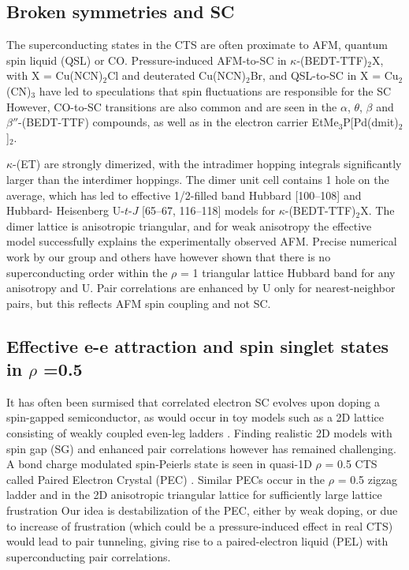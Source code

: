 \documentclass[a4paper,11pt]{article}
\begin{document}
\subsection{Broken symmetries and SC}
The superconducting states in the CTS are often proximate to AFM, quantum spin liquid (QSL) or CO. 
Pressure-induced AFM-to-SC in $\kappa$-(BEDT-TTF)$_{2}$X, 
with X = Cu(NCN)$_{2}$Cl and deuterated Cu(NCN)$_{2}$Br, and QSL-to-SC in X = Cu$_{2}$(CN)$_{3}$ have led to speculations that
spin fluctuations are responsible for the SC \cite{kino98a}%
However, CO-to-SC transitions
are also common and are seen in the $\alpha$, $\theta$, $\beta$ and  $\beta''$-(BEDT-TTF) compounds, 
as well as in the electron carrier EtMe$_{3}$P[Pd(dmit)$_{2}$]$_{2}$. 


$\kappa$-(ET) are strongly dimerized, with the intradimer
hopping integrals significantly larger than the interdimer hoppings. The dimer unit cell contains
1 hole on the average, which has led to effective 1/2-filled band Hubbard [100–108] and Hubbard-
Heisenberg U-$t$-$J$ [65–67, 116–118] models for $\kappa$-(BEDT-TTF)$_{2}$X. The dimer lattice is anisotropic triangular,
and for weak anisotropy the effective model successfully explains the experimentally observed AFM. 
Precise numerical work by our group \cite{ngomes12a} and others \cite{tocchio09a, yanagisawa13a} 
have however shown that there is no superconducting order within the $\rho$ = 1  
triangular lattice Hubbard band for any anisotropy and U. Pair correlations are enhanced by U 
only for nearest-neighbor pairs, but this reflects AFM spin coupling and not SC.

\subsection{Effective e-e attraction and spin singlet states in $\rho$ =0.5}
It has often been surmised that correlated electron SC evolves upon doping a spin-gapped semiconductor, 
as would occur in toy models such as a 2D lattice consisting of weakly coupled even-leg ladders \cite{arrigoni04a}.
Finding realistic 2D models with spin gap (SG) and enhanced pair correlations however has remained challenging. 
A bond charge modulated spin-Peierls state is seen in quasi-1D $\rho$ = 0.5 CTS called Paired Electron Crystal (PEC) \cite{clay12a}. 
Similar PECs occur in the $\rho$ = 0.5 zigzag ladder \cite{clay05a} and in the 2D anisotropic triangular lattice for sufficiently 
large lattice frustration %
Our idea is destabilization of the PEC, either by weak doping, or due to
increase of frustration (which could be a pressure-induced effect in real CTS) would lead to pair tunneling,
giving rise to a paired-electron liquid (PEL) with superconducting pair correlations.  
\end{document}
